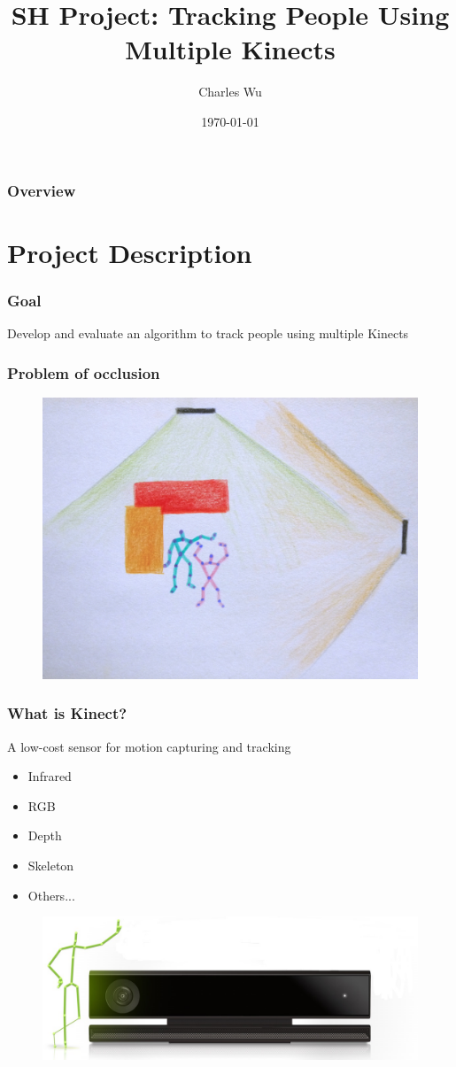 \documentclass{beamer}
\title[TPUMK]{SH Project: Tracking People Using Multiple Kinects} %
\author{Charles Wu} %
\institute[St Andrews] %
{
University of St Andrews \\ %
\medskip
\textit{cjw21@st-andrews.ac.uk} %
}
\date{\today} %
\begin{document}

\begin{frame}
\titlepage %
\end{frame}

\begin{frame}
\frametitle{Overview} %
\tableofcontents
\end{frame}

\section{Project Description}

\begin{frame}
\frametitle{Goal}
Develop and evaluate an algorithm to track people using multiple Kinects
\end{frame}

\begin{frame}
\frametitle{Problem of occlusion}
\begin{figure}
\includegraphics[width=0.8\linewidth]{occlusion}
\end{figure}
\end{frame}

\begin{frame}
\frametitle{What is Kinect?}
A low-cost sensor for motion capturing and tracking
\begin{itemize}
	\item Infrared
	\item RGB
	\item Depth
	\item Skeleton
	\item Others...
\end{itemize}
\begin{figure}
\includegraphics[width=0.8\linewidth]{kinect}
\end{figure}
\end{frame}
\end{document}

